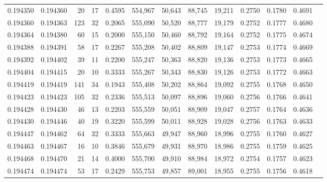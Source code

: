 \begin{tabular}{rrrrrrrrrrrrr}
0.194350 & 0.194360 &    20 &  17 &                                     0.4595 & 554,967 &  50,643 &  88,745 &  19,211 & 0.2750 & 0.1780 & 0.4691 \\
0.194360 & 0.194363 &   123 &  32 &                                     0.2065 & 555,090 &  50,520 &  88,777 &  19,179 & 0.2752 & 0.1777 & 0.4680 \\
0.194364 & 0.194380 &    60 &  15 &                                     0.2000 & 555,150 &  50,460 &  88,792 &  19,164 & 0.2752 & 0.1775 & 0.4674 \\
0.194388 & 0.194391 &    58 &  17 &                                     0.2267 & 555,208 &  50,402 &  88,809 &  19,147 & 0.2753 & 0.1774 & 0.4669 \\
0.194392 & 0.194402 &    39 &  11 &                                     0.2200 & 555,247 &  50,363 &  88,820 &  19,136 & 0.2753 & 0.1773 & 0.4665 \\
0.194404 & 0.194415 &    20 &  10 &                                     0.3333 & 555,267 &  50,343 &  88,830 &  19,126 & 0.2753 & 0.1772 & 0.4663 \\
0.194419 & 0.194419 &   141 &  34 &                                     0.1943 & 555,408 &  50,202 &  88,864 &  19,092 & 0.2755 & 0.1768 & 0.4650 \\
0.194423 & 0.194423 &   105 &  32 &                                     0.2336 & 555,513 &  50,097 &  88,896 &  19,060 & 0.2756 & 0.1766 & 0.4641 \\
0.194428 & 0.194430 &    46 &  13 &                                     0.2203 & 555,559 &  50,051 &  88,909 &  19,047 & 0.2757 & 0.1764 & 0.4636 \\
0.194430 & 0.194446 &    40 &  19 &                                     0.3220 & 555,599 &  50,011 &  88,928 &  19,028 & 0.2756 & 0.1763 & 0.4633 \\
0.194447 & 0.194462 &    64 &  32 &                                     0.3333 & 555,663 &  49,947 &  88,960 &  18,996 & 0.2755 & 0.1760 & 0.4627 \\
0.194463 & 0.194467 &    16 &  10 &                                     0.3846 & 555,679 &  49,931 &  88,970 &  18,986 & 0.2755 & 0.1759 & 0.4625 \\
0.194468 & 0.194470 &    21 &  14 &                                     0.4000 & 555,700 &  49,910 &  88,984 &  18,972 & 0.2754 & 0.1757 & 0.4623 \\
0.194474 & 0.194474 &    53 &  17 &                                     0.2429 & 555,753 &  49,857 &  89,001 &  18,955 & 0.2755 & 0.1756 & 0.4618 \\

\end{tabular}
